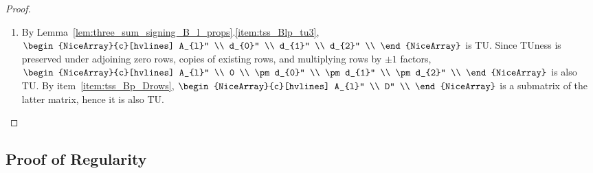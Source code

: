 \begin{proof}
\begin{enumerate}
        \item By Lemma~\ref{lem:three_sum_signing_B_l_props}.\ref{item:tss_Blp_tu3}, $\begin{NiceArray}{c}[hvlines] A_{l}'' \\ d_{0}'' \\ d_{1}'' \\ d_{2}'' \\ \end{NiceArray}$ is TU. Since TUness is preserved under adjoining zero rows, copies of existing rows, and multiplying rows by $\pm 1$ factors, $\begin{NiceArray}{c}[hvlines] A_{l}'' \\ 0 \\ \pm d_{0}'' \\ \pm d_{1}'' \\ \pm d_{2}'' \\ \end{NiceArray}$ is also TU. By item~\ref{item:tss_Bp_Drows}, $\begin{NiceArray}{c}[hvlines] A_{l}'' \\ D'' \\ \end{NiceArray}$ is a submatrix of the latter matrix, hence it is also TU.
    \end{enumerate}
\end{proof}


\subsection{Proof of Regularity}

